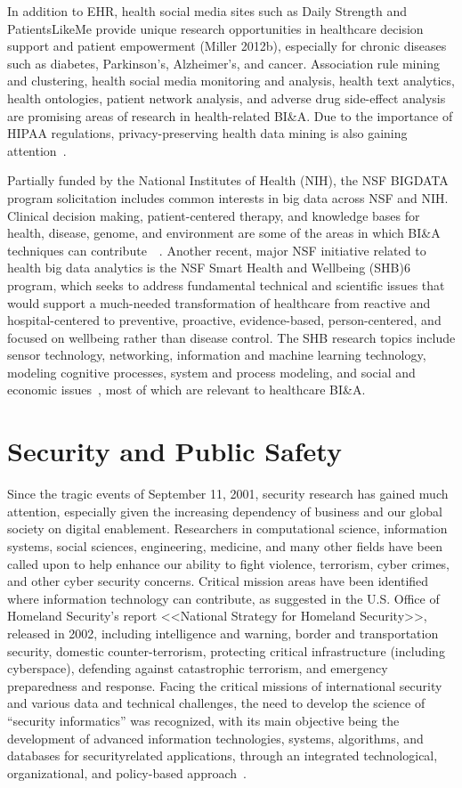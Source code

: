 In addition to EHR, health social media sites such as Daily
Strength and PatientsLikeMe provide unique research opportunities
in healthcare decision support and patient empowerment
(Miller 2012b), especially for chronic diseases such as
diabetes, Parkinson’s, Alzheimer’s, and cancer. Association
rule mining and clustering, health social media monitoring
and analysis, health text analytics, health ontologies, patient
network analysis, and adverse drug side-effect analysis are
promising areas of research in health-related BI\&A. Due to
the importance of HIPAA regulations, privacy-preserving
health data mining is also gaining attention~\cite{Gelfand:2012}.

Partially funded by the National Institutes of Health (NIH),
the NSF BIGDATA program solicitation includes common
interests in big data across NSF and NIH. Clinical decision
making, patient-centered therapy, and knowledge bases for
health, disease, genome, and environment are some of the
areas in which BI\&A techniques can contribute~\cite{Chen:2011b}~\cite{Wactlar:2011}. Another recent, major NSF initiative
related to health big data analytics is the NSF Smart Health
and Wellbeing (SHB)6
program, which seeks to address
fundamental technical and scientific issues that would support
a much-needed transformation of healthcare from reactive and
hospital-centered to preventive, proactive, evidence-based,
person-centered, and focused on wellbeing rather than disease
control. The SHB research topics include sensor technology,
networking, information and machine learning technology,
modeling cognitive processes, system and process modeling,
and social and economic issues~\cite{Wactlar:2011}, most of
which are relevant to healthcare BI\&A.

\section{Security and Public Safety}
Since the tragic events of September 11, 2001, security
research has gained much attention, especially given the
increasing dependency of business and our global society on
digital enablement. Researchers in computational science,
information systems, social sciences, engineering, medicine,
and many other fields have been called upon to help enhance
our ability to fight violence, terrorism, cyber crimes, and other
cyber security concerns. Critical mission areas have been
identified where information technology can contribute, as
suggested in the U.S. Office of Homeland Security’s report
<<National Strategy for Homeland Security>>, released in 2002,
including intelligence and warning, border and transportation
security, domestic counter-terrorism, protecting critical infrastructure
(including cyberspace), defending against catastrophic
terrorism, and emergency preparedness and response.
Facing the critical missions of international security and
various data and technical challenges, the need to develop the
science of “security informatics” was recognized, with its
main objective being the development of advanced information technologies, systems, algorithms, and databases for securityrelated applications, through an integrated technological,
organizational, and policy-based approach~\cite{Chen:2006}.

